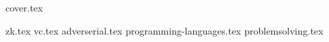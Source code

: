 \documentclass{book}
\begin{document}
{cover.tex}

\tableofcontents

{zk.tex}
{vc.tex}
{adverserial.tex}
{programming-languages.tex}
{problemsolving.tex}
\end{document}
